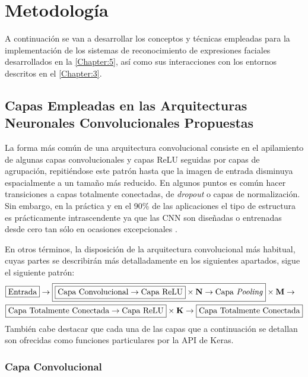 \chapter{Metodología} \label{Chapter:4}

A continuación se van a desarrollar los conceptos y técnicas empleadas para la implementación de los sistemas de reconocimiento de expresiones faciales desarrollados en la \autoref{Chapter:5}, así como sus interacciones con los entornos descritos en el \autoref{Chapter:3}.

\section{Capas Empleadas en las Arquitecturas Neuronales Convolucionales Propuestas} \label{Chapter:Layers}

La forma más común de una arquitectura convolucional consiste en el apilamiento de algunas capas convolucionales y capas ReLU seguidas por capas de agrupación, repitiéndose este patrón hasta que la imagen de entrada disminuya espacialmente a un tamaño más reducido. En algunos puntos es común hacer transiciones a capas totalmente conectadas, de \textit{dropout} o capas de normalización. Sin embargo, en la práctica y en el 90\% de las aplicaciones el tipo de estructura es prácticamente intrascendente ya que las CNN son diseñadas o entrenadas desde cero tan sólo en ocasiones excepcionales \cite{CS231n}.

En otros términos, la disposición de la arquitectura convolucional más habitual, cuyas partes se describirán más detalladamente en los siguientes apartados, sigue el siguiente patrón:
\begin{align*}
    &\boxed{\text{Entrada}} \rightarrow \boxed{\boxed{\text{Capa Convolucional} \rightarrow \text{Capa ReLU}} \times \textbf{N} \rightarrow \text{Capa \textit{Pooling}}} \times \textbf{M} \rightarrow \\ 
    & \boxed{\text{Capa Totalmente Conectada} \rightarrow \text{Capa ReLU}} \times \textbf{K} \rightarrow \boxed{\text{Capa Totalmente Conectada}}
\end{align*}
También cabe destacar que cada una de las capas que a continuación se detallan son ofrecidas como funciones particulares por la API de Keras.

\subsection{Capa Convolucional}

